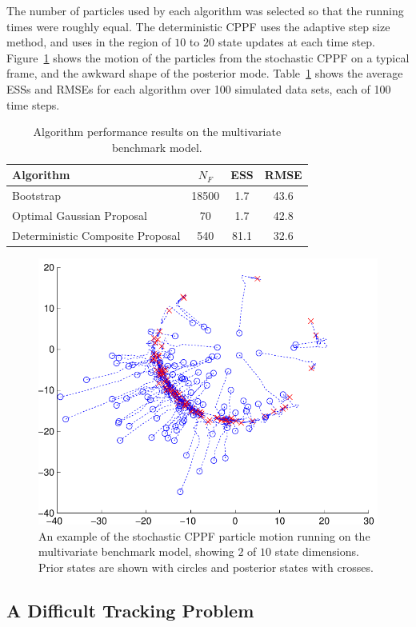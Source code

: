 \documentclass{article}
\begin{document}
The number of particles used by each algorithm was selected so that the running times were roughly equal. The deterministic CPPF uses the adaptive step size method, and uses in the region of $10$ to $20$ state updates at each time step. Figure~\ref{fig:nlng_example_frame} shows the motion of the particles from the stochastic CPPF on a typical frame, and the awkward shape of the posterior mode. Table~\ref{tab:nlng_results} shows the average ESSs and RMSEs for each algorithm over 100 simulated data sets, each of 100 time steps.%
%
\begin{table}
\centering
\begin{tabular}{l||c|c|c}
Algorithm                                & $N_F$ & ESS  & RMSE \\
\hline
Bootstrap                                & 18500 &  1.7 & 43.6 \\
Optimal Gaussian Proposal                &    70 &  1.7 & 42.8 \\
Deterministic Composite Proposal         &   540 & 81.1 & 32.6 \\
\end{tabular}
\caption{Algorithm performance results on the multivariate benchmark model.}
\label{tab:nlng_results}
\end{table}
%
\begin{figure}
\centering
\includegraphics[width=0.45\columnwidth]{nlng_example_frame.pdf}
\caption{An example of the stochastic CPPF particle motion running on the multivariate benchmark model, showing $2$ of $10$ state dimensions. Prior states are shown with circles and posterior states with crosses.}
\label{fig:nlng_example_frame}
\end{figure}



\subsection{A Difficult Tracking Problem}
\end{document}
